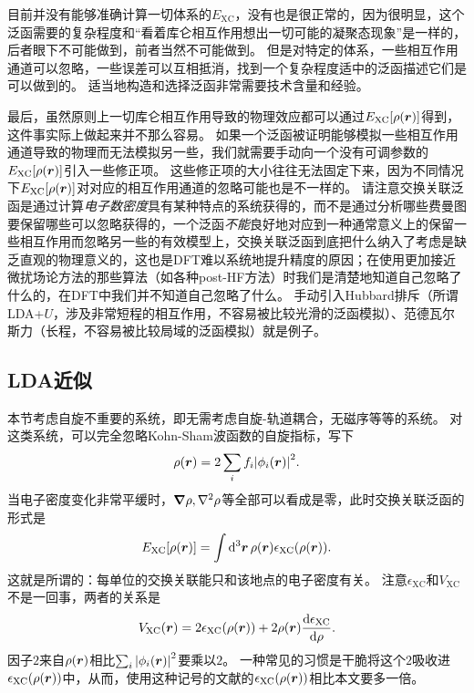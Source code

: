目前并没有能够准确计算一切体系的$E_\text{XC}$，没有也是很正常的，因为很明显，这个泛函需要的复杂程度和“看着库仑相互作用想出一切可能的凝聚态现象”是一样的，后者眼下不可能做到，前者当然不可能做到。
但是对特定的体系，一些相互作用通道可以忽略，一些误差可以互相抵消，找到一个复杂程度适中的泛函描述它们是可以做到的。
适当地构造和选择泛函非常需要技术含量和经验。

最后，虽然原则上一切库仑相互作用导致的物理效应都可以通过$E_\text{XC}[\rho(\vb*{r})]$得到，这件事实际上做起来并不那么容易。
如果一个泛函被证明能够模拟一些相互作用通道导致的物理而无法模拟另一些，我们就需要手动向一个没有可调参数的$E_\text{XC}[\rho(\vb*{r})]$引入一些修正项。
这些修正项的大小往往无法固定下来，因为不同情况下$E_\text{XC}[\rho(\vb*{r})]$对对应的相互作用通道的忽略可能也是不一样的。
请注意交换关联泛函是通过计算\emph{电子数密度}具有某种特点的系统获得的，而不是通过分析哪些费曼图要保留哪些可以忽略获得的，一个泛函\emph{不能}良好地对应到一种通常意义上的保留一些相互作用而忽略另一些的有效模型上，交换关联泛函到底把什么纳入了考虑是缺乏直观的物理意义的，这也是DFT难以系统地提升精度的原因；在使用更加接近微扰场论方法的那些算法（如各种post-HF方法）时我们是清楚地知道自己忽略了什么的，在DFT中我们并不知道自己忽略了什么。
手动引入Hubbard排斥（所谓LDA+$U$，涉及非常短程的相互作用，不容易被比较光滑的泛函模拟）、范德瓦尔斯力（长程，不容易被比较局域的泛函模拟）就是例子。

\subsection{LDA近似}

本节考虑自旋不重要的系统，即无需考虑自旋-轨道耦合，无磁序等等的系统。
对这类系统，可以完全忽略Kohn-Sham波函数的自旋指标，写下
\begin{equation}
    \rho(\vb*{r}) = 2 \sum_{i} f_i \abs{\phi_i(\vb*{r})}^2.
\end{equation}
当电子密度变化非常平缓时，$\grad{\rho},\laplacian{\rho}$等全部可以看成是零，此时交换关联泛函的形式是
\begin{equation}
    E_\text{XC}[\rho(\vb*{r})] = \int \dd[3]{\vb*{r}} \rho(\vb*{r}) \epsilon_\text{XC}(\rho(\vb*{r})).
\end{equation}
这就是所谓的：每单位的交换关联能只和该地点的电子密度有关。
注意$\epsilon_\text{XC}$和$V_\text{XC}$不是一回事，两者的关系是
\begin{equation}
    V_\text{XC}(\vb*{r}) = 2 \epsilon_{\text{XC}}(\rho(\vb*{r})) + 2 \rho(\vb*{r}) \dv{\epsilon_\text{XC}}{\rho}.
    \label{eq:from-epsilon-xc-to-v-xc}
\end{equation}
因子$2$来自$\rho(\vb*{r})$相比$\sum_i \abs{\phi_i(\vb*{r})}^2$要乘以$2$。
一种常见的习惯是干脆将这个$2$吸收进$\epsilon_\text{XC}(\rho(\vb*{r}))$中，从而，使用这种记号的文献的$\epsilon_\text{XC}(\rho(\vb*{r}))$相比本文要多一倍。


